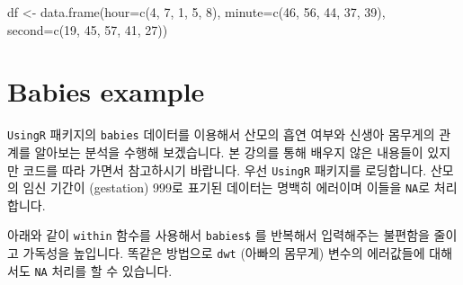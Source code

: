 \documentclass[
  a4paper,
]{book}
\newenvironment{Shaded}{\begin{snugshade}}{\end{snugshade}}
\newcommand{\AttributeTok}[1]{\textcolor[rgb]{0.40,0.45,0.13}{#1}}
\newcommand{\ConstantTok}[1]{\textcolor[rgb]{0.56,0.35,0.01}{#1}}
\newcommand{\DecValTok}[1]{\textcolor[rgb]{0.68,0.00,0.00}{#1}}
\newcommand{\DocumentationTok}[1]{\textcolor[rgb]{0.37,0.37,0.37}{\textit{#1}}}
\newcommand{\FunctionTok}[1]{\textcolor[rgb]{0.28,0.35,0.67}{#1}}
\newcommand{\NormalTok}[1]{\textcolor[rgb]{0.00,0.23,0.31}{#1}}
\newcommand{\OtherTok}[1]{\textcolor[rgb]{0.00,0.23,0.31}{#1}}
\newcommand{\SpecialCharTok}[1]{\textcolor[rgb]{0.37,0.37,0.37}{#1}}
\begin{document}
\begin{Shaded}
\begin{Highlighting}[]
\NormalTok{df }\OtherTok{\textless{}{-}} \FunctionTok{data.frame}\NormalTok{(}\AttributeTok{hour=}\FunctionTok{c}\NormalTok{(}\DecValTok{4}\NormalTok{, }\DecValTok{7}\NormalTok{, }\DecValTok{1}\NormalTok{, }\DecValTok{5}\NormalTok{, }\DecValTok{8}\NormalTok{),}
                 \AttributeTok{minute=}\FunctionTok{c}\NormalTok{(}\DecValTok{46}\NormalTok{, }\DecValTok{56}\NormalTok{, }\DecValTok{44}\NormalTok{, }\DecValTok{37}\NormalTok{, }\DecValTok{39}\NormalTok{),}
                 \AttributeTok{second=}\FunctionTok{c}\NormalTok{(}\DecValTok{19}\NormalTok{, }\DecValTok{45}\NormalTok{, }\DecValTok{57}\NormalTok{, }\DecValTok{41}\NormalTok{, }\DecValTok{27}\NormalTok{))}
\end{Highlighting}
\end{Shaded}

\hypertarget{babies-example}{%
\section{Babies example}\label{babies-example}}

\texttt{UsingR} 패키지의 \texttt{babies} 데이터를 이용해서 산모의 흡연
여부와 신생아 몸무게의 관계를 알아보는 분석을 수행해 보겠습니다. 본
강의를 통해 배우지 않은 내용들이 있지만 코드를 따라 가면서 참고하시기
바랍니다. 우선 \texttt{UsingR} 패키지를 로딩합니다. 산모의 임신 기간이
(gestation) 999로 표기된 데이터는 명백히 에러이며 이들을 \texttt{NA}로
처리합니다.

\begin{Shaded}
\end{Shaded}

아래와 같이 \texttt{within} 함수를 사용해서 \texttt{babies\$} 를
반복해서 입력해주는 불편함을 줄이고 가독성을 높입니다. 똑같은 방법으로
\texttt{dwt} (아빠의 몸무게) 변수의 에러값들에 대해서도 \texttt{NA}
처리를 할 수 있습니다.
\end{document}
